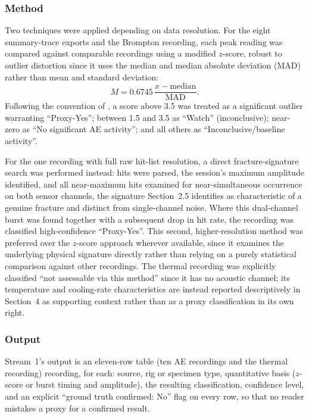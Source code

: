 \documentclass[a4paper]{article}
\begin{document}
\subsubsection{Method}
Two techniques were applied depending on data resolution. For the eight summary-trace exports and the Brompton recording, each peak reading was compared against comparable recordings using a modified $z$-score, robust to outlier distortion since it uses the median and median absolute deviation (MAD) rather than mean and standard deviation:
\begin{equation}
  M = 0.6745\,\frac{x-\mathrm{median}}{\mathrm{MAD}}.
\end{equation}
Following the convention of \citet{iglewicz1993}, a score above 3.5 was treated as a significant outlier warranting ``Proxy-Yes''; between 1.5 and 3.5 as ``Watch'' (inconclusive); near-zero as ``No significant AE activity''; and all others as ``Inconclusive/baseline activity''.

For the one recording with full raw hit-list resolution, a direct fracture-signature search was performed instead: hits were parsed, the session's maximum amplitude identified, and all near-maximum hits examined for near-simultaneous occurrence on both sensor channels, the signature Section~2.5 identifies as characteristic of a genuine fracture and distinct from single-channel noise. Where this dual-channel burst was found together with a subsequent drop in hit rate, the recording was classified high-confidence ``Proxy-Yes''. This second, higher-resolution method was preferred over the $z$-score approach wherever available, since it examines the underlying physical signature directly rather than relying on a purely statistical comparison against other recordings. The thermal recording was explicitly classified ``not assessable via this method'' since it has no acoustic channel; its temperature and cooling-rate characteristics are instead reported descriptively in Section~4 as supporting context rather than as a proxy classification in its own right.

\subsubsection{Output}
Stream~1's output is an eleven-row table (ten AE recordings and the thermal recording) recording, for each: source, rig or specimen type, quantitative basis ($z$-score or burst timing and amplitude), the resulting classification, confidence level, and an explicit ``ground truth confirmed: No'' flag on every row, so that no reader mistakes a proxy for a confirmed result.
\end{document}
